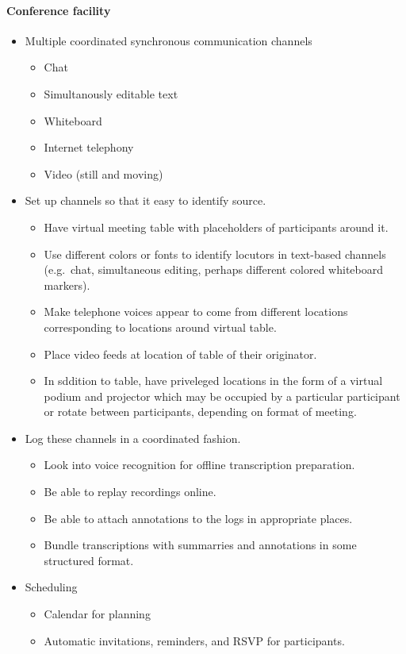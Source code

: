 \begin{itemize}
\paragraph{Conference facility}

\begin{itemize}
\item
  Multiple coordinated synchronous communication channels 
  \begin{itemize}
  \item Chat
  \item Simultanously editable text
  \item Whiteboard 
  \item Internet telephony
  \item Video (still and moving)
  \end{itemize}
\item
  Set up channels so that it easy to identify source. 
  \begin{itemize}
  \item
    Have virtual meeting table with placeholders of participants around it. 
  \item  
    Use different colors or fonts to identify locutors in text-based 
    channels (e.g.~chat, simultaneous editing, perhaps different colored 
    whiteboard markers). 
  \item  
    Make telephone voices appear to come from different locations 
    corresponding to locations around virtual table. 
  \item
    Place video feeds at location of table of their originator. 
  \item
    In sddition to table, have priveleged locations in the form of a 
    virtual podium and projector which may be occupied by a particular 
    participant or rotate between participants, depending on format 
    of meeting.
    \end{itemize}
\item
  Log these channels in a coordinated fashion. 
  \begin{itemize}
  \item
    Look into voice recognition for offline transcription preparation. 
  \item  
    Be able to replay recordings online. 
  \item    
    Be able to attach annotations to the logs in appropriate places. 
  \item  
    Bundle transcriptions with summarries and annotations in some 
    structured format.
  \end{itemize}  
\item
  Scheduling
  \begin{itemize}
  \item
    Calendar for planning 
  \item  
    Automatic invitations, reminders, and RSVP for participants.
  \end{itemize}
\end{itemize}


\end{itemize}
